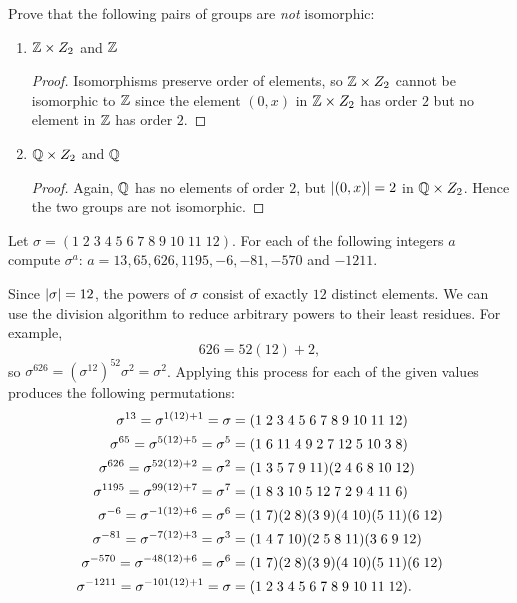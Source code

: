  Prove that the following pairs of groups are {\em not}
isomorphic:
\begin{enumerate}
\item $\mathbb{Z}\times Z_2$ and $\mathbb{Z}$
  \begin{proof}
    Isomorphisms preserve order of elements, so $\mathbb{Z}\times Z_2$ cannot
    be isomorphic to $\mathbb{Z}$ since the element $(0,x)$ in $\mathbb{Z}\times Z_2$
    has order $2$ but no element in $\mathbb{Z}$ has order $2$.
  \end{proof}
\item $\mathbb{Q}\times Z_2$ and $\mathbb{Q}$
  \begin{proof}
    Again, $\mathbb{Q}$ has no elements of order $2$, but $\lvert{(0,x)}\rvert = 2$ in
    $\mathbb{Q}\times Z_2$. Hence the two groups are not isomorphic.
  \end{proof}
\end{enumerate}

 Let $\sigma =
(1\;2\;3\;4\;5\;6\;7\;8\;9\;10\;11\;12)$. For each of the following
integers $a$ compute $\sigma^a$:
$a = 13, 65, 626, 1195, -6, -81, -570$ and $-1211$.
\begin{solution}
  Since $\lvert{\sigma}\rvert = 12$, the powers of $\sigma$ consist of exactly
  $12$ distinct elements. We can use the division algorithm to reduce
  arbitrary powers to their least residues. For example,
  \begin{equation*}
    626 = 52(12) + 2,
  \end{equation*}
  so $\sigma^{626} = (\sigma^{12})^{52}\sigma^2 = \sigma^2$. Applying
  this process for each of the given values produces the following
  permutations:
  \begin{align*}
    \sigma^{13} = \sigma^{1(12) + 1} = \sigma
    &= (1\;2\;3\;4\;5\;6\;7\;8\;9\;10\;11\;12) \\
    \sigma^{65} = \sigma^{5(12) + 5} = \sigma^5
    &= (1\;6\;11\;4\;9\;2\;7\;12\;5\;10\;3\;8) \\
    \sigma^{626} = \sigma^{52(12)+2} = \sigma^2
    &= (1\;3\;5\;7\;9\;11)(2\;4\;6\;8\;10\;12) \\
    \sigma^{1195} = \sigma^{99(12)+7} = \sigma^7
    &= (1\;8\;3\;10\;5\;12\;7\;2\;9\;4\;11\;6) \\
    \sigma^{-6} = \sigma^{-1(12)+6} = \sigma^6
    &= (1\;7)(2\;8)(3\;9)(4\;10)(5\;11)(6\;12) \\
    \sigma^{-81} = \sigma^{-7(12)+3} = \sigma^3
    &= (1\;4\;7\;10)(2\;5\;8\;11)(3\;6\;9\;12) \\
    \sigma^{-570} = \sigma^{-48(12)+6} = \sigma^6
    &= (1\;7)(2\;8)(3\;9)(4\;10)(5\;11)(6\;12) \\
    \sigma^{-1211} = \sigma^{-101(12)+1} = \sigma
    &= (1\;2\;3\;4\;5\;6\;7\;8\;9\;10\;11\;12). \qedhere
  \end{align*}
\end{solution}

